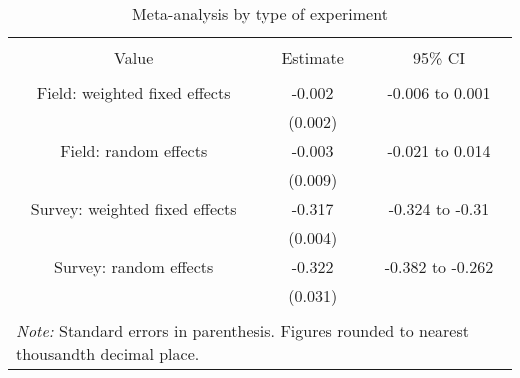 
\begin{table}[!htbp] \centering 
  \caption{Meta-analysis by type of experiment} 
  \label{meta_type} 
\begin{tabular}{@{\extracolsep{30pt}} ccc} 
\\[-1.8ex]\hline 
\hline \\[-1.8ex] 
Value & Estimate & 95\% CI \\ 
\hline \\[-1.8ex] 
Field: weighted fixed effects  & -0.002 & -0.006 to 0.001 \\ 
 & (0.002) &  \\ 
Field: random effects & -0.003 & -0.021 to 0.014 \\ 
 & (0.009) &  \\ 
Survey: weighted fixed effects  & -0.317 & -0.324 to -0.31 \\ 
 & (0.004) &  \\ 
Survey: random effects & -0.322 & -0.382 to -0.262 \\ 
 & (0.031) &  \\ 
\hline \\[-1.8ex] 
\multicolumn{3}{l}{\parbox[t]{\textwidth}{\footnotesize \textit{Note:} Standard errors in parenthesis. Figures rounded to nearest thousandth decimal place.}} \\ 
\end{tabular} 
\end{table} 

